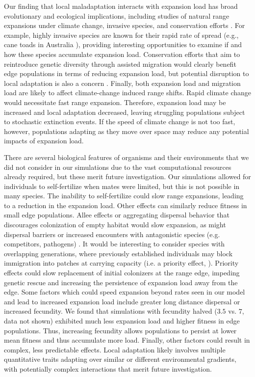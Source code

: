 Our finding that local maladaptation interacts with expansion load has broad evolutionary and ecological implications, including studies of natural range expansions under climate change, invasive species, and conservation efforts \citep{Hunter:1994}. For example, highly invasive species are known for their rapid rate of spread (e.g., cane toads in Australia \citealt{Phillips:2006}), providing interesting opportunities to examine if and how these species accumulate expansion load. Conservation efforts that aim to reintroduce genetic diversity through assisted migration would clearly benefit edge populations in terms of reducing expansion load, but potential disruption to local adaptation is also a concern \citep{Aitken:2013}. Finally, both expansion load and migration load are likely to affect climate-change induced range shifts. Rapid climate change would necessitate fast range expansion. Therefore, expansion load may be increased and local adaptation decreased, leaving struggling populations subject to stochastic extinction events. If the speed of climate change is not too fast, however, populations adapting as they move over space may reduce any potential impacts of expansion load. 

There are several biological features of organisms and their environments that we did not consider in our simulations due to the vast computational resources already required, but these merit future investigation. Our simulations allowed for individuals to self-fertilize when mates were limited, but this is not possible in many species. The inability to self-fertilize could slow range expansions, leading to a reduction in the expansion load. Other effects can similarly reduce fitness in small edge populations. Allee effects \citep{Taylor:2005} or aggregating dispersal behavior that discourages colonization of empty habitat \citep{Altwegg:2013} would slow expansion, as might dispersal barriers or increased encounters with antagonistic species (e.g. competitors, pathogens) \citep{Case:2005, Kubisch:2013}. It would be interesting to consider species with overlapping generations, where previously established individuals may block immigration into patches at carrying capacity (i.e. a priority effect, \citealt{Atkins:2010}). Priority effects could slow replacement of initial colonizers at the range edge, impeding genetic rescue and increasing the persistence of expansion load away from the edge. Some factors which could speed expansion beyond rates seen in our model and lead to increased expansion load include greater long distance dispersal or increased fecundity. We found that simulations with fecundity halved ($3.5$ vs. $7$, data not shown) exhibited much less expansion load and higher fitness in edge populations. Thus, increasing fecundity allows populations to persist at lower mean fitness and thus accumulate more load. Finally, other factors could result in complex, less predictable effects.  Local adaptation likely involves multiple quantitative traits adapting over similar or different environmental gradients, with potentially complex interactions that merit future investigation.

